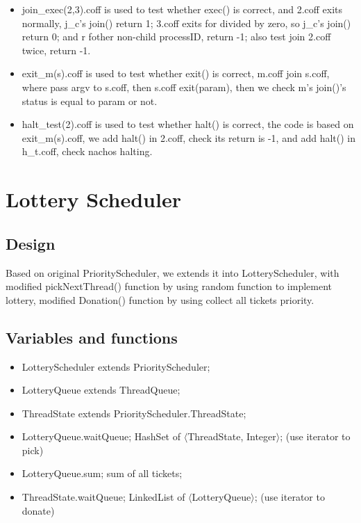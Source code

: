 \documentclass[a4paper,10pt]{article}
\begin{document}
\begin{itemize}
\item join\_exec(2,3).coff is used to test whether exec() is correct, and 2.coff exits normally, j\_c's join() return 1; 3.coff exits for divided by zero, so j\_c's join() return 0; and r fother non-child processID, return -1; also test join 2.coff twice, return -1.
\item exit\_m(s).coff is used to test whether exit() is correct, m.coff join s.coff, where pass argv to s.coff, then s.coff exit(param), then we check m's join()'s status is equal to param or not.
\item halt\_test(2).coff is used to test whether halt() is correct, the code is based on exit\_m(s).coff, we add halt() in 2.coff, check its return is -1, and add halt() in h\_t.coff, check nachos halting.
\end{itemize}


\section{Lottery Scheduler}

\subsection{Design}
Based on original PriorityScheduler, we extends it into LotteryScheduler, with modified pickNextThread() function by using random function to implement lottery, modified Donation() function by using collect all tickets priority.
\subsection{Variables and functions}
\begin{itemize}
\item LotteryScheduler extends PriorityScheduler;
\item LotteryQueue extends ThreadQueue;
\item ThreadState extends PriorityScheduler.ThreadState;
\item LotteryQueue.waitQueue; HashSet of $\langle$ThreadState, Integer$\rangle$; (use iterator to pick)
\item LotteryQueue.sum; sum of all tickets;
\item ThreadState.waitQueue; LinkedList of $\langle$LotteryQueue$\rangle$; (use iterator to donate)
\end{itemize}
\end{document}
